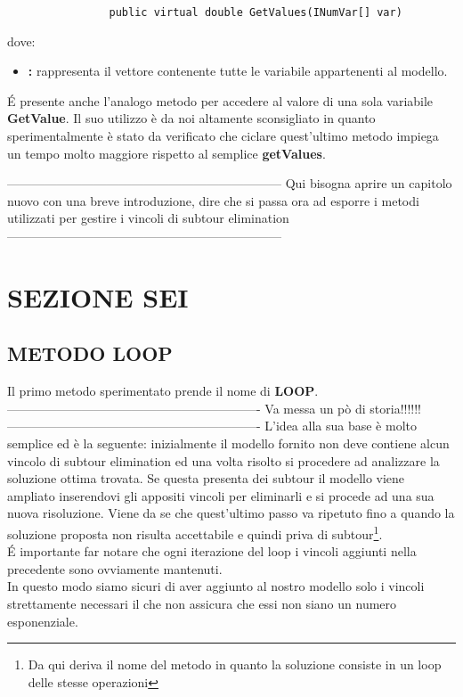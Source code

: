 \documentclass[11pt]{article}
\begin{document}
\begin{lstlisting}
                public virtual double GetValues(INumVar[] var)
\end{lstlisting}

dove:

\begin{itemize}
\item \textbf: rappresenta il vettore contenente tutte le variabile appartenenti al modello.
\end{itemize}

\'E presente anche l'analogo metodo per accedere al valore di una sola variabile \textbf{GetValue}. Il suo utilizzo è da noi altamente sconsigliato in quanto sperimentalmente è stato da verificato che ciclare quest'ultimo metodo impiega un tempo molto maggiore rispetto al semplice \textbf{getValues}.



------------------------------------------------------------------
Qui bisogna aprire un capitolo nuovo con una breve introduzione, dire che si passa ora ad esporre i metodi utilizzati per gestire i vincoli di subtour elimination
------------------------------------------------------------------

\section*{SEZIONE SEI}
\label{sec:SezioneSeiS}

\subsection*{METODO LOOP}
\label{sec:MetodoLoopS}

Il primo metodo sperimentato prende il nome di \textbf{LOOP}.
-------------------------------------------------------------
Va messa un pò di storia!!!!!!
-------------------------------------------------------------
L'idea alla sua base è molto semplice ed è la seguente: inizialmente il modello fornito non deve contiene alcun vincolo di subtour elimination ed una volta risolto si procedere ad analizzare la soluzione ottima trovata. Se questa presenta dei subtour il modello viene ampliato inserendovi gli appositi vincoli per eliminarli e si procede ad una sua nuova risoluzione. Viene da se che quest'ultimo passo va ripetuto fino a quando la soluzione proposta non risulta accettabile e quindi priva di subtour\footnote{Da qui deriva il nome del metodo in quanto la soluzione consiste in un loop delle stesse operazioni}.\\\'E importante far notare che ogni iterazione del loop i vincoli aggiunti nella precedente sono ovviamente mantenuti.\\
In questo modo siamo sicuri di aver aggiunto al nostro modello solo i vincoli strettamente necessari il che non assicura che essi non siano un numero esponenziale.\\
\end{document}
